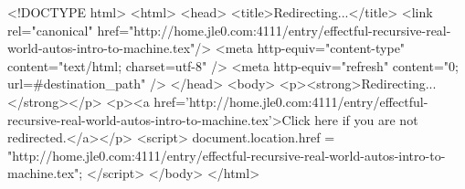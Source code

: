 <!DOCTYPE html>
<html>
<head>
<title>Redirecting...</title>
<link rel="canonical" href="http://home.jle0.com:4111/entry/effectful-recursive-real-world-autos-intro-to-machine.tex"/>
<meta http-equiv="content-type" content="text/html; charset=utf-8" />
<meta http-equiv="refresh" content="0; url=#{destination_path}" />
</head>
<body>
  <p><strong>Redirecting...</strong></p>
  <p><a href='http://home.jle0.com:4111/entry/effectful-recursive-real-world-autos-intro-to-machine.tex'>Click here if you are not redirected.</a></p>
  <script>
    document.location.href = "http://home.jle0.com:4111/entry/effectful-recursive-real-world-autos-intro-to-machine.tex";
  </script>
</body>
</html>
